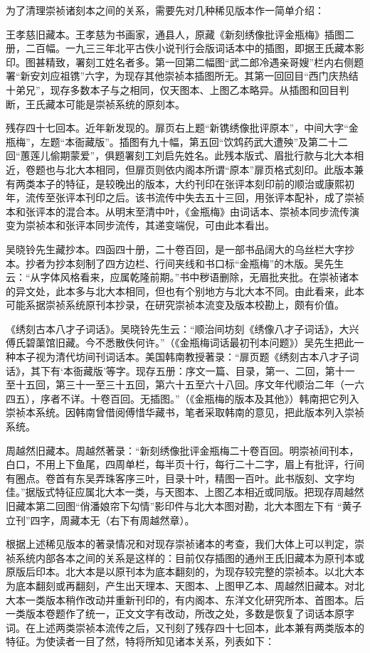 \documentclass[a4paper,12pt,UTF8,twoside]{ctexbook}
\begin{document}
为了清理崇祯诸刻本之间的关系，需要先对几种稀见版本作一简单介绍：

王孝慈旧藏本。王孝慈为书画家，通县人，原藏《新刻绣像批评金瓶梅》插图二册，二百幅。一九三三年北平古佚小说刊行会版词话本中的插图，即据王氏藏本影印。图甚精致，署刻工姓名者多。第一回第二幅图“武二郎冷遇亲哥嫂”栏内右侧题署“新安刘应祖镌”六字，为现存其他崇祯本插图所无。其第一回回目“西门庆热结十弟兄”，现存多数本子与之相同，仅天图本、上图乙本略异。从插图和回目判断，王氏藏本可能是崇祯系统的原刻本。

残存四十七回本。近年新发现的。扉页右上题“新镌绣像批评原本”，中间大字“金瓶梅”，左题“本衙藏版”。插图有九十幅，第五回“饮鸩药武大遭殃”及第二十二回“蕙莲儿偷期蒙爱”，俱题署刻工刘启先姓名。此残本版式、眉批行款与北大本相近，卷题也与北大本相同，但扉页则依内阁本所谓“原本”扉页格式刻印。此版本兼有两类本子的特征，是较晚出的版本，大约刊印在张评本刻印前的顺治或康熙初年，流传至张评本刊印之后。该书流传中失去五十三回，用张评本配补，成了崇祯本和张评本的混合本。从明末至清中叶，《金瓶梅》由词话本、崇祯本同步流传演变为崇祯本和张评本同步流传，其递变端倪，可由此本看出。

吴晓铃先生藏抄本。四函四十册，二十卷百回，是一部书品阔大的乌丝栏大字抄本。抄者为抄本刻制了四方边栏、行间夹线和书口标“金瓶梅”的木版。吴先生云：“从字体风格看来，应属乾隆前期。”书中秽语删除，无眉批夹批。在崇祯诸本的异文处，此本多与北大本相同，但也有个别地方与北大本不同。由此看来，此本可能系据崇祯系统原刊本抄录，在研究崇祯本流变及版本校勘上，颇有价值。

《绣刻古本八才子词话》。吴晓铃先生云：“顺治间坊刻《绣像八才子词话》，大兴傅氏碧蕖馆旧藏。今不悉散佚何许。”（《金瓶梅词话最初刊本问题》）吴先生把此一种本子视为清代坊间刊词话本。美国韩南教授著录：“扉页题《绣刻古本八才子词话》，其下有‘本衙藏版’等字。现存五册：序文一篇、目录，第一、二回，第十一至十五回，第三十一至三十五回，第六十五至六十八回。序文年代顺治二年（一六四五），序者不详。十卷百回。无插图。”（《金瓶梅的版本及其他》）韩南把它列入崇祯本系统。因韩南曾借阅傅惜华藏书，笔者采取韩南的意见，把此版本列入崇祯系统。

周越然旧藏本。周越然著录：“新刻绣像批评金瓶梅二十卷百回。明崇祯间刊本，白口，不用上下鱼尾，四周单栏，每半页十行，每行二十二字，眉上有批评，行间有圈点。卷首有东吴弄珠客序三叶，目录十叶，精图一百叶。此书版刻、文字均佳。”据版式特征应属北大本一类，与天图本、上图乙本相近或同版。把现存周越然旧藏本第二回图“俏潘娘帘下勾情”影印件与北大本图对勘，北大本图左下有 “黄子立刊”四字，周藏本无（右下有周越然章）。

根据上述稀见版本的著录情况和对现存崇祯诸本的考查，我们大体上可以判定，崇祯系统内部各本之间的关系是这样的：目前仅存插图的通州王氏旧藏本为原刊本或原版后印本。北大本是以原刊本为底本翻刻的，为现存较完整的崇祯本。以北大本为底本翻刻或再翻刻，产生出天理本、天图本、上图甲乙本、周越然旧藏本。对北大本一类版本稍作改动并重新刊印的，有内阁本、东洋文化研究所本、首图本。后一类版本卷题作了统一，正文文字有改动，所改之处，多数是恢复了词话本原字词。在上述两类崇祯本流传之后，又刊刻了残存四十七回本，此本兼有两类版本的特征。为使读者一目了然，特将所知见诸本关系，列表如下：
\end{document}
